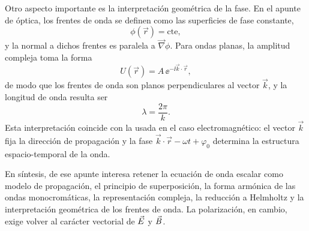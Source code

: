 \documentclass[../main.tex]{subfiles}
\begin{document}
Otro aspecto importante es la interpretación geométrica de la fase. En el apunte de óptica, los frentes de onda se definen como las superficies de fase constante,
\begin{equation*}
    \phi(\vec r)=\text{cte},
\end{equation*}
y la normal a dichos frentes es paralela a $\vec\nabla\phi$. Para ondas planas, la amplitud compleja toma la forma
\begin{equation*}
    U(\vec r)=A\,\ee^{-\ii\vec k\cdot\vec r},
\end{equation*}
de modo que los frentes de onda son planos perpendiculares al vector $\vec k$, y la longitud de onda resulta ser
\begin{equation*}
    \lambda=\frac{2\pi}{k}.
\end{equation*}
Esta interpretación coincide con la usada en el caso electromagnético: el vector $\vec k$ fija la dirección de propagación y la fase $\vec k\cdot\vec r-\omega t+\varphi_0$ determina la estructura espacio-temporal de la onda.

En síntesis, de ese apunte interesa retener la ecuación de onda escalar como modelo de propagación, el principio de superposición, la forma armónica de las ondas monocromáticas, la representación compleja, la reducción a Helmholtz y la interpretación geométrica de los frentes de onda. La polarización, en cambio, exige volver al carácter vectorial de $\vec{E}$ y $\vec{B}$.
\end{document}
